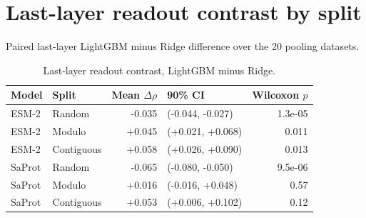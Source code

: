 \documentclass[11pt,a4paper]{article}
\begin{document}
\section*{Last-layer readout contrast by split}
Paired last-layer LightGBM minus Ridge difference over the 20 pooling datasets.
\begin{table}[H]\centering\small
\caption{Last-layer readout contrast, LightGBM minus Ridge.}\label{tab:S10}
\begin{tabular}{llrlr}
\toprule
Model & Split & Mean $\Delta\rho$ & 90\% CI & Wilcoxon $p$ \\
\midrule
ESM-2 & Random & -0.035 & (-0.044, -0.027) & 1.3e-05 \\
ESM-2 & Modulo & +0.045 & (+0.021, +0.068) & 0.011 \\
ESM-2 & Contiguous & +0.058 & (+0.026, +0.090) & 0.013 \\
\midrule
SaProt & Random & -0.065 & (-0.080, -0.050) & 9.5e-06 \\
SaProt & Modulo & +0.016 & (-0.016, +0.048) & 0.57 \\
SaProt & Contiguous & +0.053 & (+0.006, +0.102) & 0.12 \\
\bottomrule
\end{tabular}\end{table}
\end{document}
